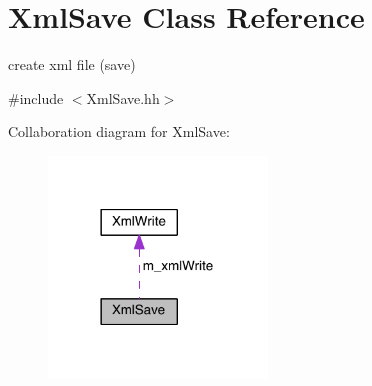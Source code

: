 \hypertarget{class_xml_save}{}\section{Xml\+Save Class Reference}
\label{class_xml_save}


create xml file (save)  




{\ttfamily \#include $<$Xml\+Save.\+hh$>$}



Collaboration diagram for Xml\+Save\+:\nopagebreak
\begin{figure}[H]
\begin{center}
\leavevmode
\includegraphics[width=165pt]{class_xml_save__coll__graph}
\end{center}
\end{figure}
